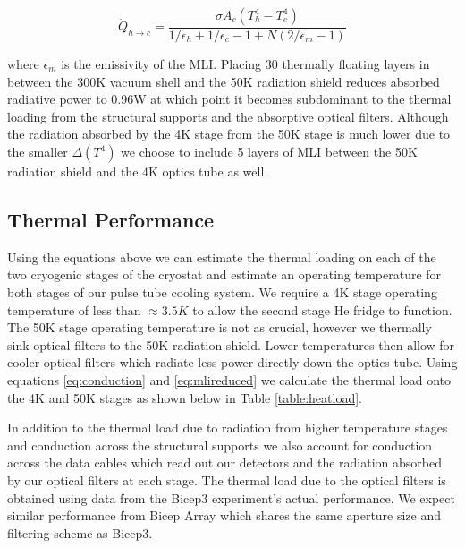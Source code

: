 \documentclass[12pt]{article}
\begin{document}
\begin{equation}
	\dot{Q}_{h\rightarrow c}=\frac{\sigma A_c (T_h^4 - T_c ^4)}{1/\epsilon _h
	+ 1/\epsilon _c -1 + N(2/\epsilon _m -1)}
	\label{eq:mlireduced}
\end{equation}

where $\epsilon _m$ is the emissivity of the MLI. Placing 30 thermally
floating layers in between the 300K vacuum shell and the 50K radiation shield
reduces absorbed radiative power to 0.96W at which point it becomes
subdominant to the thermal loading from the structural supports and the
absorptive optical filters. Although the radiation absorbed by the 4K stage
from the 50K stage is much lower due to the smaller $\Delta (T^4)$ we choose
to include 5 layers of MLI between the 50K radiation shield and the 4K optics
tube as well.


\subsection{Thermal Performance}
Using the equations above we can estimate the thermal loading on each of the
two cryogenic stages of the cryostat and estimate an operating temperature for both
stages of our pulse tube cooling system. We require a 4K stage operating
temperature of less than $\approx 3.5K$ to allow the second stage He fridge to
function. The 50K stage operating temperature is not as crucial, however we
thermally sink optical filters to the 50K radiation shield. Lower
temperatures then allow for cooler optical filters which radiate less power
directly down the optics tube. Using equations \ref{eq:conduction} and
\ref{eq:mlireduced} we calculate the thermal load onto the 4K and 50K stages
as shown below in Table \ref{table:heatload}.

In addition to the thermal load due to radiation from higher temperature
stages and conduction across the structural supports we also account for
conduction across the data cables which read out our detectors and the
radiation absorbed by our optical filters at each stage. The thermal load due
to the optical filters is obtained using data from the Bicep3 experiment's
actual performance. We expect similar performance from Bicep Array which
shares the same aperture size and filtering scheme as Bicep3.
\end{document}
